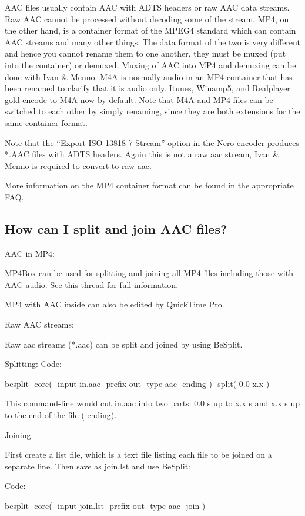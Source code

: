 ﻿\documentclass[12pt]{article}
\begin{document}
AAC files usually contain AAC with ADTS headers or raw AAC data streams. Raw AAC cannot be processed
without decoding some of the stream. MP4, on the other hand, is a container format of the MPEG4
standard which can contain AAC streams and many other things. The data format of the two is very
different and hence you cannot rename them to one another, they must be muxed (put into the
container) or demuxed. Muxing of AAC into MP4 and demuxing can be done with Ivan \& Menno. M4A is
normally audio in an MP4 container that has been renamed to clarify that it is audio only. Itunes,
Winamp5, and Realplayer gold encode to M4A now by default. Note that M4A and MP4 files can be
switched to each other by simply renaming, since they are both extensions for the same container
format.

Note that the ``Export ISO 13818-7 Stream'' option in the Nero encoder produces *.AAC files with ADTS
headers. Again this is not a raw aac stream, Ivan \& Menno is required to convert to raw aac.

More information on the MP4 container format can be found in the appropriate FAQ. 

\subsection{How can I split and join AAC files?}

AAC in MP4:

MP4Box can be used for splitting and joining all MP4 files including those with AAC audio. See this
thread for full information.

MP4 with AAC inside can also be edited by QuickTime Pro.

Raw AAC streams:

Raw aac streams (*.aac) can be split and joined by using BeSplit.

Splitting:
Code:

besplit -core( -input in.aac -prefix out -type aac -ending ) -split( 0.0 x.x )

This command-line would cut in.aac into two parts: 0.0 s up to x.x s and x.x s up to the end of the
file (-ending).

Joining:

First create a list file, which is a text file listing each file to be joined on a separate line.
Then save as join.lst and use BeSplit:

Code:

besplit -core( -input join.lst -prefix out -type aac -join )
\end{document}

